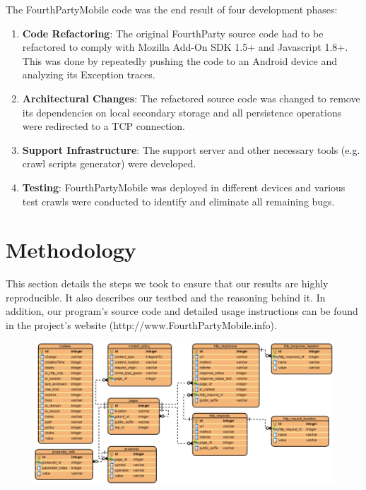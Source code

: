 \documentclass{acm_proc_article-sp}
\begin{document}
The FourthPartyMobile code was the end result of four development phases:

\begin{enumerate}
\item \textbf{Code Refactoring}: The original FourthParty source code had to be refactored to comply with Mozilla Add-On SDK 1.5+ and Javascript 1.8+. This was done by repeatedly pushing the code to an Android device and analyzing its Exception traces.

\item \textbf{Architectural Changes}: The refactored source code was changed to remove its dependencies on local secondary storage and all persistence operations were redirected to a TCP connection.

\item \textbf{Support Infrastructure}: The support server and other necessary tools (e.g. crawl scripts generator) were developed.

\item \textbf{Testing}: FourthPartyMobile was deployed in different devices and various test crawls were conducted to identify and eliminate all remaining bugs.

\end{enumerate}

\section{Methodology}
This section details the steps we took to ensure that our results are highly reproducible. It also describes our testbed and the reasoning behind it. In addition, our program's source code and detailed usage instructions can be found in the project's website (http://www.FourthPartyMobile.info).


\begin{figure}[ht] 
\centering \includegraphics[scale=0.70]{diagrams/db_diagram.png}
\label{fig:db_schema}
\end{figure}
\end{document}
